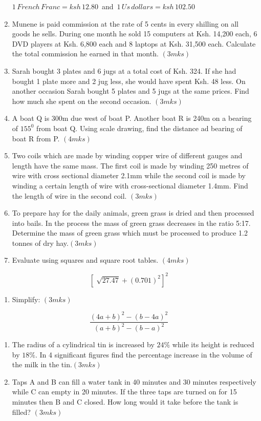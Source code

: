 \documentclass[
  a4paperpaper,
]{scrbook}
\providecommand{\tightlist}{%
  \setlength{\itemsep}{0pt}\setlength{\parskip}{0pt}}\usepackage{longtable,booktabs,array}
\begin{document}
\begin{tcolorbox}
\begin{enumerate}
  \(1\, French \, Franc = ksh \,12.80\,\) and
  \(\,1 \,Us \,dollars = ksh \,102.50\)
\item
  Munene is paid commission at the rate of 5 cents in every shilling on
  all goods he sells. During one month he sold 15 computers at Ksh.
  14,200 each, 6 DVD players at Ksh. 6,800 each and 8 laptops at Ksh.
  31,500 each. Calculate the total commission he earned in that month.
  \((3mks)\)
\item
  Sarah bought 3 plates and 6 jugs at a total cost of Ksh. 324. If she
  had bought 1 plate more and 2 jug less, she would have spent Ksh. 48
  less. On another occasion Sarah bought 5 plates and 5 jugs at the same
  prices. Find how much she spent on the second occasion. \((3mks)\)
\item
  A boat Q is 300m due west of boat P. Another boat R is 240m on a
  bearing of \(155^0\) from boat Q. Using scale drawing, find the
  distance ad bearing of boat R from P. \((4mks)\)
\item
  Two coils which are made by winding copper wire of different gauges
  and length have the same mass. The first coil is made by winding 250
  metres of wire with cross sectional diameter 2.1mm while the second
  coil is made by winding a certain length of wire with cross-sectional
  diameter 1.4mm. Find the length of wire in the second coil. \((3mks)\)
\item
  To prepare hay for the daily animals, green grass is dried and then
  processed into bails. In the process the mass of green grass decreases
  in the ratio 5:17. Determine the mass of green grass which must be
  processed to produce 1.2 tonnes of dry hay.\((3mks)\)
\item
  Evaluate using squares and square root tables. \((4mks)\)
\end{enumerate}

\[\left[\sqrt[]{27.47}+(0.701)^2 \right]^2\]

\begin{enumerate}
\def\labelenumi{\arabic{enumi}.}
\setcounter{enumi}{13}
\tightlist
\item
  Simplify: \((3mks)\)
\end{enumerate}

\[\frac{(4a+b)^2-(b-4a)^2}{(a+b)^2-(b-a)^2}\]

\begin{enumerate}
\def\labelenumi{\arabic{enumi}.}
\setcounter{enumi}{14}
\item
  The radius of a cylindrical tin is increased by \(24\%\) while its
  height is reduced by \(18\%\). In 4 significant figures find the
  percentage increase in the volume of the milk in the tin.\((3mks)\)
\item
  Taps A and B can fill a water tank in 40 minutes and 30 minutes
  respectively while C can empty in 20 minutes. If the three taps are
  turned on for 15 minutes then B and C closed. How long would it take
  before the tank is filled? \((3mks)\)
\end{enumerate}


\end{tcolorbox}
\end{document}

